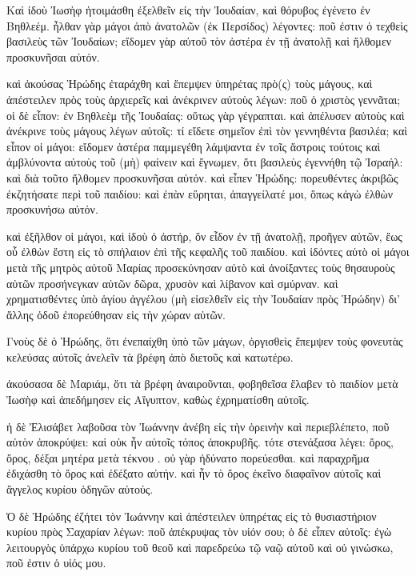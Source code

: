 \pend\pstart
{}

\pend\pstart

Καὶ ἰδοὺ Ἰωσὴφ ἡτοιμάσθη ἐξελθεῖν εἰς τὴν Ἰουδαίαν, καὶ θόρυβος ἐγένετο ἐν Βηθλεέμ. ἦλθαν γὰρ μάγοι ἀπὸ ἀνατολῶν (ἐκ Περσίδος) λέγοντες: ποῦ ἐστιν ὁ τεχθεὶς βασιλεὺς τῶν Ἰουδαίων; εἴδομεν γὰρ αὐτοῦ τὸν ἀστέρα ἐν τῇ ἀνατολῇ καὶ ἤλθομεν προσκυνῆσαι αὐτόν.

\pend\pstart
καὶ ἀκούσας Ἡρώδης ἐταράχθη καὶ ἔπεμψεν ὑπηρέτας πρὸ(ς) τοὺς μάγους, καὶ ἀπέστειλεν πρὸς τοὺς ἀρχιερεῖς καὶ ἀνέκρινεν αὐτοὺς λέγων: ποῦ ὁ χριστὸς γεννᾶται; οἱ δὲ εἶπον: ἐν Βηθλεὲμ τῆς Ἰουδαίας: οὕτως γὰρ γέγραπται. καὶ ἀπέλυσεν αὐτοὺς καὶ ἀνέκρινε τοὺς μάγους λέγων αὐτοῖς: τί εἴδετε σημεῖον ἐπὶ τὸν γεννηθέντα βασιλέα; καὶ εἶπον οἱ μάγοι: εἴδομεν ἀστέρα παμμεγέθη λάμψαντα ἐν τοῖς ἄστροις τούτοις καὶ ἀμβλύνοντα αὐτοὺς τοῦ (μὴ) φαίνειν καὶ ἔγνωμεν, ὅτι βασιλεὺς ἐγεννήθη τῷ Ἰσραήλ: καὶ διὰ τοῦτο ἤλθομεν προσκυνῆσαι αὐτόν. καὶ εἶπεν Ἡρώδης: πορευθέντες ἀκριβῶς ἐκζητήσατε περὶ τοῦ παιδίου: καὶ ἐπὰν εὕρηται, ἀπαγγείλατέ μοι, ὅπως κἀγὼ ἐλθὼν προσκυνήσω αὐτόν.

\pend\pstart
καὶ ἐξῆλθον οἱ μάγοι, καὶ ἰδοὺ ὁ ἀστήρ, ὅν εἶδον ἐν τῇ ἀνατολῇ, προῆγεν αὐτῶν, ἕως οὗ ἐλθὼν ἔστη εἰς τὸ σπήλαιον ἐπὶ τῆς κεφαλῆς τοῦ παιδίου. καὶ ἰδόντες αὐτὸ οἱ μάγοι μετὰ τῆς μητρὸς αὐτοῦ Μαρίας προσεκύνησαν αὐτὸ καὶ ἀνοίξαντες τοὺς θησαυροὺς αὐτῶν προσήνεγκαν αὐτῶν δῶρα, χρυσὸν καὶ λίβανον καὶ σμύρναν. καὶ χρηματισθέντες ὑπὸ ἁγίου ἀγγέλου (μὴ εἰσελθεῖν εἰς τὴν Ἰουδαίαν πρὸς Ἡρώδην) δι' ἄλλης ὁδοῦ ἐπορεύθησαν εἰς τὴν χώραν αὐτῶν.

\pend\pstart
{}

\pend\pstart
Γνοὺς δὲ ὁ Ἡρώδης, ὅτι ἐνεπαίχθη ὑπὸ τῶν μάγων, ὀργισθεὶς ἔπεμψεν τοὺς φονευτὰς κελεύσας αὐτοῖς ἀνελεῖν τὰ βρέφη ἀπὸ διετοῦς καὶ κατωτέρω.

\pend\pstart
ἀκούσασα δὲ Μαριάμ, ὅτι τὰ βρέφη ἀναιροῦνται, φοβηθεῖσα ἔλαβεν τὸ παιδίον μετὰ Ἰωσὴφ καὶ ἀπεδήμησεν εἰς Αἴγυπτον, καθὼς ἐχρηματίσθη αὐτοῖς.

\pend\pstart
ἡ δὲ Ἐλισάβετ λαβοῦσα τὸν Ἰωάννην ἀνέβη εἰς τὴν ὀρεινὴν καὶ περιεβλέπετο, ποῦ αὐτὸν ἀποκρύψει: καὶ οὐκ ἦν αὐτοῖς τόπος ἀποκρυβῆς. τότε στενάξασα λέγει: ὄρος, ὄρος, δέξαι μητέρα μετὰ τέκνου . οὐ γὰρ ἠδύνατο πορεύεσθαι. καὶ παραχρῆμα ἐδιχάσθη τὸ ὄρος καὶ ἐδέξατο αὐτήν. καὶ ἦν τὸ ὄρος ἐκεῖνο διαφαῖνον αὐτοῖς καὶ ἄγγελος κυρίου ὁδηγῶν αὐτούς.

\pend\pstart
{}

\pend\pstart
Ὁ δὲ Ἡρώδης ἐζήτει τὸν Ἰωάννην καὶ ἀπέστειλεν ὑπηρέτας εἰς τὸ θυσιαστήριον κυρίου πρὸς Σαχαρίαν λέγων: ποῦ ἀπέκρυψας τὸν υἱόν σου; ὁ δὲ εἶπεν αὐτοῖς: ἐγὼ λειτουργὸς ὑπάρχω κυρίου τοῦ θεοῦ καὶ παρεδρεύω τῷ ναῷ αὐτοῦ καὶ οὐ γινώσκω, ποῦ ἐστιν ὁ υἱός μου.

